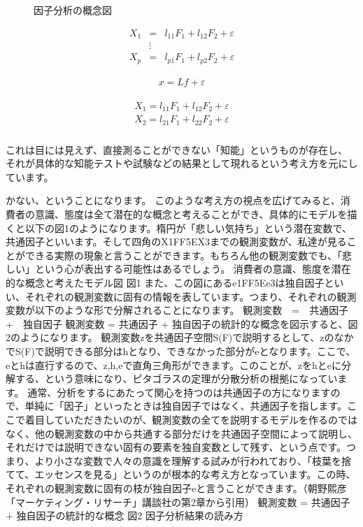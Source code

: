 \documentclass[a4j,11pt,mc]{jreport}
\begin{document}
\begin{figure}[H]
	\caption{因子分析の概念図}
	\label{FAdiagram}
\end{figure}



	\begin{eqnarray}
	X_1 &=&l_{11}F_1+l_{12}F_2+\varepsilon\\
	&\vdots&\\\nonumber
	X_p &=&l_{p1}F_1+l_{p2}F_2+\varepsilon
	\end{eqnarray}



		\begin{eqnarray}
		x=Lf+\varepsilon
		\end{eqnarray}

	\begin{eqnarray}
	\begin{split}
	X_1 =l_{11}F_1+l_{12}F_2+\varepsilon\\\nonumber
	X_2 =l_{21}F_1+l_{22}F_2+\varepsilon\\
	\end{split}
	\end{eqnarray}






これは目には見えず、直接測ることができない「知能」というものが存在し、
それが具体的な知能テストや試験などの結果として現れるという考え方を元にしています。


かない、ということになります。
このような考え方の視点を広げてみると、消費者の意識、態度は全て潜在的な概念と考えることができ、具体的にモデルを描くと以下の図1のようになります。楕円が「悲しい気持ち」という潜在変数で、共通因子といいます。そして四角のX1{FF5E}X3までの観測変数が、私達が見ることができる実際の現象と言うことができます。もちろん他の観測変数でも、「悲しい」という心が表出する可能性はあるでしょう。
消費者の意識、態度を潜在的な概念と考えたモデル図
図1
また、この図にあるe1{FF5E}e3は独自因子といい、それぞれの観測変数に固有の情報を表しています。つまり、それぞれの観測変数が以下のような形で分解されることになります。
観測変数　=　共通因子　+　独自因子
観測変数 = 共通因子 + 独自因子の統計的な概念を図示すると、図2のようになります。
観測変数zを共通因子空間S(F)で説明するとして、zのなかでS(F)で説明できる部分はhとなり、できなかった部分がeとなります。ここで、eとhは直行するので、z,h,eで直角三角形ができます。このことが、zをhとeに分解する、という意味になり、ピタゴラスの定理が分散分析の根拠になっています。
通常、分析をするにあたって関心を持つのは共通因子の方になりますので、単純に「因子」といったときは独自因子ではなく、共通因子を指します。ここで着目していただきたいのが、観測変数の全てを説明するモデルを作るのではなく、他の観測変数の中から共通する部分だけを共通因子空間によって説明し、それだけでは説明できない固有の要素を独自変数として残す、という点です。つまり、より小さな変数で人々の意識を理解する試みが行われており、「枝葉を捨てて、エッセンスを見る」というのが根本的な考え方となっています。この時、それぞれの観測変数に固有の枝が独自因子eと言うことができます。（朝野熙彦「マーケティング・リサーチ」講談社の第2章から引用）
観測変数 = 共通因子 + 独自因子の統計的な概念
図2
因子分析結果の読み方
\end{document}
